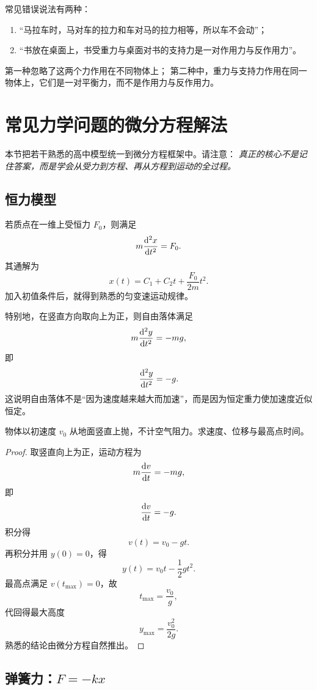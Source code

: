 \begin{remark}
常见错误说法有两种：
\begin{enumerate}
  \item “马拉车时，马对车的拉力和车对马的拉力相等，所以车不会动”；
  \item “书放在桌面上，书受重力与桌面对书的支持力是一对作用力与反作用力”。
\end{enumerate}
第一种忽略了这两个力作用在不同物体上；
第二种中，重力与支持力作用在同一物体上，它们是一对平衡力，而不是作用力与反作用力。
\end{remark}

\section{常见力学问题的微分方程解法}

本节把若干熟悉的高中模型统一到微分方程框架中。请注意：
\emph{真正的核心不是记住答案，而是学会从受力到方程、再从方程到运动的全过程。}

\subsection{恒力模型}

若质点在一维上受恒力 $F_0$，则满足
\[
  m\dv[2]{x}{t}=F_0.
\]
其通解为
\[
  x(t)=C_1+C_2 t+\frac{F_0}{2m}t^2.
\]
加入初值条件后，就得到熟悉的匀变速运动规律。

特别地，在竖直方向取向上为正，则自由落体满足
\[
  m\dv[2]{y}{t}=-mg,
\]
即
\[
  \dv[2]{y}{t}=-g.
\]
这说明自由落体不是“因为速度越来越大而加速”，而是因为恒定重力使加速度近似恒定。

\begin{example}[竖直上抛的微分方程解]
物体以初速度 $v_0$ 从地面竖直上抛，不计空气阻力。求速度、位移与最高点时间。
\end{example}

\begin{proof}
取竖直向上为正，运动方程为
\[
  m\dv{v}{t}=-mg,
\]
即
\[
  \dv{v}{t}=-g.
\]
积分得
\[
  v(t)=v_0-gt.
\]
再积分并用 $y(0)=0$，得
\[
  y(t)=v_0 t-\frac{1}{2}gt^2.
\]
最高点满足 $v(t_\text{max})=0$，故
\[
  t_\text{max}=\frac{v_0}{g},
\]
代回得最大高度
\[
  y_{\text{max}}=\frac{v_0^2}{2g}.
\]
熟悉的结论由微分方程自然推出。
\end{proof}

\subsection{弹簧力：$F=-kx$}


